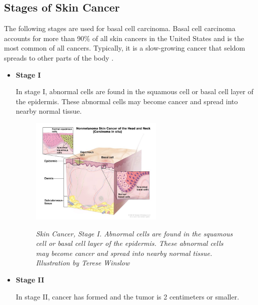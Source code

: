 \subsection{Stages of Skin Cancer}

The following stages are used for basal cell carcinoma. Basal cell carcinoma
accounts for more than 90\% of all skin cancers in the United States and is the
most common of all cancers. Typically, it is a slow-growing cancer that seldom
spreads to other parts of the body \cite{CancerInstitute}. \newline

\begin{itemize}

  \item \textbf{Stage I}

    In stage I, abnormal cells are found in the squamous cell or basal cell
    layer of the epidermis. These abnormal cells may become cancer and spread
    into nearby normal tissue.

    \begin{figure}[H] \centering
      \includegraphics[width=0.6\textwidth]{imatges/problem_domain/phase0-skin-cancer.jpg}
      \caption[Skin Cancer, Stage I]{\textit{Skin Cancer, Stage I. Abnormal
      cells are found in the squamous cell or basal cell layer of the
      epidermis. These abnormal cells may become cancer and spread into nearby
      normal tissue. Illustration by Terese Winslow}}
    {\label{fig:stage0-skin-canceer}} \end{figure}

    \newpage

  \item \textbf{Stage II}

    In stage II, cancer has formed and the tumor is 2 centimeters or smaller.


\end{itemize}

